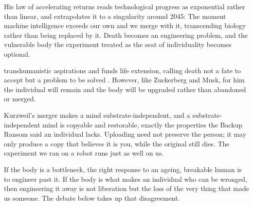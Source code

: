 
 His law of accelerating returns
reads technological progress as exponential rather
than linear, and extrapolates it to a singularity around 2045: The moment
machine intelligence exceeds our own and we merge with it, transcending
biology rather than being replaced by it.\cite{kurzweil2005singularity}
Death becomes an engineering problem, and the vulnerable body the
experiment treated as the seat of individuality becomes optional.

 transhumanistic aspirations and
funds life extension, calling death not a fate to accept but a problem to be
solved \cite{wapo2015thiel}. However, like Zuckerberg and Musk, for him the 
individual will remain and the body will be upgraded rather than abandoned or merged.

 
 Kurzweil's merger makes a mind
substrate-independent, and a substrate-independent mind is copyable and
restorable, exactly the properties the Backup Ransom said an individual lacks.
Uploading need not preserve the person; it may only produce a copy that
believes it is you, while the original still dies. The experiment we ran on a
robot runs just as well on us.

 If the body is a bottleneck, the
right response to an ageing, breakable human is to engineer past it. If the
body is what makes an individual who can be wronged, then engineering it away
is not liberation but the loss of the very thing that made us someone. The
debate below takes up that disagreement.














